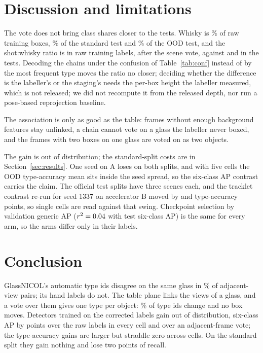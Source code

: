 \documentclass{article}
\begin{document}
\section{Discussion and limitations}
\label{sec:limits}
The vote does not bring class shares closer to the tests. Whisky is \WhiskyShareRaw\% of raw training boxes, \WhiskyShareStd\% of the standard test and \WhiskyShareOOD\% of the OOD test, and the shot:whisky ratio is \RatioRawTrain{} in raw training labels, \RatioSceneTrain{} after the scene vote, against \RatioManualStd{} and \RatioManualOOD{} in the tests. Decoding the chains under the confusion of Table~\ref{tab:conf} instead of by the most frequent type moves the ratio no closer; deciding whether the difference is the labeller's or the staging's needs the per-box height the labeller measured, which is not released; we did not recompute it from the released depth, nor run a pose-based reprojection baseline.

The association is only as good as the table: frames without enough background features stay unlinked, a chain cannot vote on a glass the labeller never boxed, and the \DupFrames{} frames with two boxes on one glass are voted on as two objects.

The gain is out of distribution; the standard-split costs are in Section~\ref{sec:results}. One seed on A loses on both splits, and with five cells the OOD type-accuracy mean sits inside the seed spread, so the six-class AP contrast carries the claim. The official test splits have three scenes each, and the tracklet contrast re-run for seed 1337 on accelerator B moved by \XHostTypeStd{} and \XHostTypeOOD{} type-accuracy points, so single cells are read against that swing. Checkpoint selection by validation generic AP ($r^2=0.04$ with test six-class AP) is the same for every arm, so the arms differ only in their labels.

\section{Conclusion}
GlassNICOL's automatic type ids disagree on the same glass in \FlipRateReg\% of adjacent-view pairs; its hand labels do not. The table plane links the views of a glass, and a vote over them gives one type per object: \SceneChangedPct\% of type ids change and no box moves. Detectors trained on the corrected labels gain out of distribution, six-class AP by \SvSixOODVsRawGain{} points over the raw labels in every cell and \SvSixOODVsTrkGain{} over an adjacent-frame vote; the type-accuracy gains are larger but straddle zero across cells. On the standard split they gain nothing and lose two points of recall.

\clearpage


\end{document}
